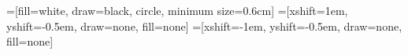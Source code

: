 \documentclass[tikz,border=10pt]{standalone}
\begin{document}
    =[fill=white, draw=black, circle, minimum size=0.6cm]
    =[xshift=1em, yshift=-0.5em, draw=none, fill=none]
    =[xshift=-1em, yshift=-0.5em, draw=none, fill=none]
    
    
    
    
\end{document}
